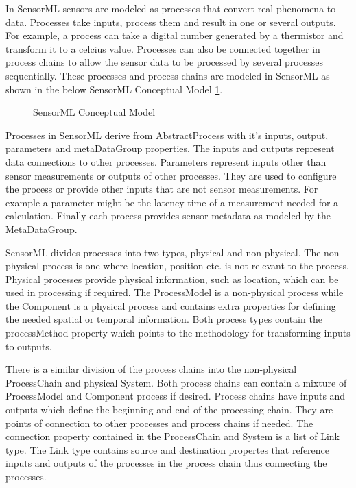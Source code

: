 \documentclass[]{final_report}
\begin{document}
In SensorML sensors are modeled as processes that convert real phenomena to data. Processes take inputs, process them and result in one or several outputs. For example, a process can take a digital number generated by a thermistor and transform it to a celcius value. Processes can also be connected together in process chains to allow the sensor data to be processed by several processes sequentially. These processes and process chains are modeled in SensorML as shown in the  below SensorML Conceptual Model \ref{fig:SMLConceptualModel}.

\begin{figure}[h]
\caption{SensorML Conceptual Model}\label{fig:SMLConceptualModel}
\end{figure}

Processes in SensorML derive from AbstractProcess with it's inputs, output, parameters and metaDataGroup properties. The inputs and outputs represent data connections to other processes. Parameters represent inputs other than sensor measurements or outputs of other processes. They are used to configure the process or provide other inputs that are not sensor measurements. For example a parameter might be the latency time of a measurement needed for a calculation. Finally each process provides sensor metadata as modeled by the MetaDataGroup.

SensorML divides processes into two types, physical and non-physical. The non-physical process is one where  location, position etc. is not relevant to the process. Physical processes provide physical information, such as location, which can be used in processing if required. The ProcessModel is a non-physical process while the Component is a physical process and contains extra properties for defining the needed spatial or temporal information. Both process types contain the processMethod property which points to the methodology for transforming inputs to outputs.

There is a similar division of the process chains into the non-physical ProcessChain and physical System. Both process chains can contain a mixture of ProcessModel and Component process if desired. Process chains have inputs and outputs which define the beginning and end of the processing chain. They are points of connection to other processes and process chains if needed. The connection property contained in the ProcessChain and System is a list of Link type. The Link type contains source and destination propertes that reference inputs and outputs of the processes in the process chain thus connecting the processes. 
\end{document}
